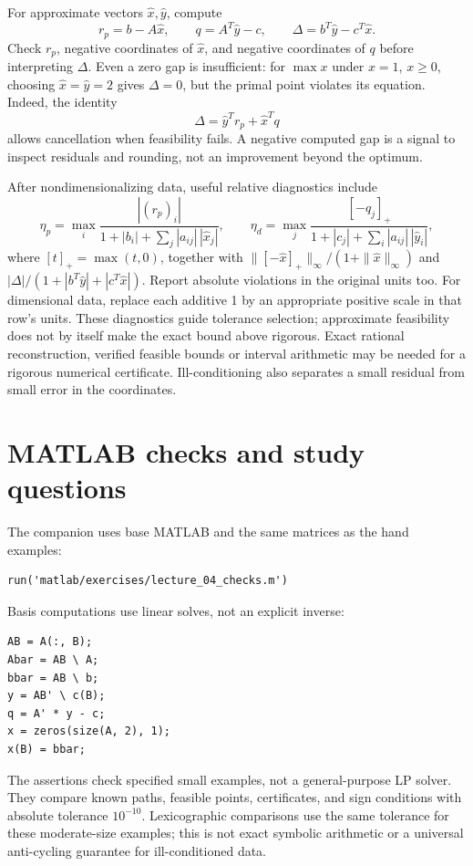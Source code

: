 \documentclass[11pt,a4paper]{article}
\begin{document}
For approximate vectors $\hat x,\hat y$, compute
\[
  r_p=b-A\hat x,\qquad q=A^T\hat y-c,\qquad
  \Delta=b^T\hat y-c^T\hat x.
\]
Check $r_p$, negative coordinates of $\hat x$, and negative coordinates of $q$
before interpreting $\Delta$. Even a zero gap is insufficient: for
$\max x$ under $x=1$, $x\geq0$, choosing $\hat x=\hat y=2$ gives
$\Delta=0$, but the primal point violates its equation.
Indeed, the identity
\[
  \Delta=\hat y^Tr_p+\hat x^Tq
\]
allows cancellation when feasibility fails. A negative computed gap is a
signal to inspect residuals and rounding, not an improvement beyond the optimum.

After nondimensionalizing data, useful relative diagnostics include
\[
  \eta_p=\max_i\frac{|(r_p)_i|}{1+|b_i|+\sum_j|a_{ij}|\,|\hat x_j|},\qquad
  \eta_d=\max_j\frac{[-q_j]_+}{1+|c_j|+\sum_i|a_{ij}|\,|\hat y_i|},
\]
where $[t]_+=\max(t,0)$, together with
$\|[-\hat x]_+\|_\infty/(1+\|\hat x\|_\infty)$ and
$|\Delta|/(1+|b^T\hat y|+|c^T\hat x|)$.
Report absolute violations in the original units too. For dimensional data,
replace each additive 1 by an appropriate positive scale in that row's units.
These diagnostics guide tolerance selection; approximate feasibility does not
by itself make the exact bound above rigorous. Exact rational reconstruction,
verified feasible bounds or interval arithmetic may be needed for a rigorous
numerical certificate. Ill-conditioning also separates a small residual from
small error in the coordinates.

\section{MATLAB checks and study questions}\label{sec:matlab}
The companion uses base MATLAB and the same matrices as the hand examples:
\begin{lstlisting}
run('matlab/exercises/lecture_04_checks.m')
\end{lstlisting}
Basis computations use linear solves, not an explicit inverse:
\begin{lstlisting}
AB = A(:, B);
Abar = AB \ A;
bbar = AB \ b;
y = AB' \ c(B);
q = A' * y - c;
x = zeros(size(A, 2), 1);
x(B) = bbar;
\end{lstlisting}
The assertions check specified small examples, not a general-purpose LP solver.
They compare known paths, feasible points, certificates, and sign conditions
with absolute tolerance $10^{-10}$. Lexicographic comparisons use the same
tolerance for these moderate-size examples; this is not exact symbolic arithmetic
or a universal anti-cycling guarantee for ill-conditioned data.
\end{document}

